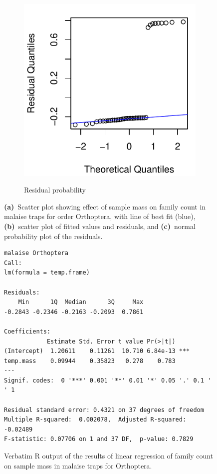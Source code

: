 \documentclass[10pt,letterpaper,twocolumn]{article}
\begin{document}
\begin{figure}[h]
\begin{subfigure}[b]{0.15\textwidth}
		\label{fig:malaise_orthoptera_resid}
	\end{subfigure}
	~
	\begin{subfigure}[b]{0.15\textwidth}
		\caption{Residual probability}
		\includegraphics[width=\textwidth]{plots/mass-vs-count/qqplot/2015_malaise_Orthoptera_qqplot.pdf}
		\label{fig:malaise_orthoptera_qqplot}
	\end{subfigure}
	\caption{\textbf{(a)}~Scatter plot showing effect of sample mass on family count in malaise traps for order Orthoptera, with line of best fit (blue), \textbf{(b)}~scatter plot of fitted values and residuals, and \textbf{(c)}~normal probability plot of the residuals.}
	\label{fig:malaise_orthoptera}
	\smallskip
	\nointerlineskip
	\hrulefill
\end{figure}

\begin{figure}[h]
	\lstset{numbers=left}
	\lstset{xleftmargin=5mm,framexleftmargin=5mm}
	\begin{lstlisting}
malaise Orthoptera
Call:
lm(formula = temp.frame)

Residuals:
    Min      1Q  Median      3Q     Max 
-0.2843 -0.2346 -0.2163 -0.2093  0.7861 

Coefficients:
            Estimate Std. Error t value Pr(>|t|)    
(Intercept)  1.20611    0.11261  10.710 6.84e-13 ***
temp.mass    0.09944    0.35823   0.278    0.783    
---
Signif. codes:  0 '***' 0.001 '**' 0.01 '*' 0.05 '.' 0.1 ' ' 1

Residual standard error: 0.4321 on 37 degrees of freedom
Multiple R-squared:  0.002078,	Adjusted R-squared:  -0.02489 
F-statistic: 0.07706 on 1 and 37 DF,  p-value: 0.7829
	\end{lstlisting}
	\caption{Verbatim R output of the results of linear regression of family count on sample mass in malaise traps for Orthoptera.}
	\label{fig:malaise_orthoptera_regression}
	\smallskip
	\nointerlineskip
	\hrulefill
\end{figure}
\end{document}
